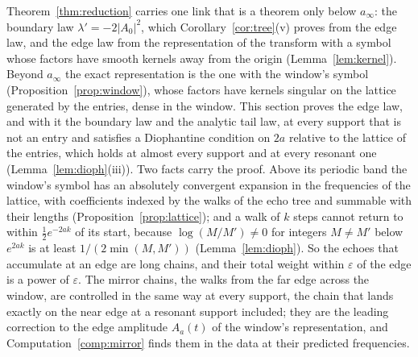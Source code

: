 \documentclass[11pt]{article}
\theoremstyle{definition}
\theoremstyle{remark}
\begin{document}
Theorem~\ref{thm:reduction} carries one link that is a theorem only below $a_\infty$: the boundary law $\lambda'=-2|A_0|^2$, which Corollary~\ref{cor:tree}(v) proves from the edge law, and the edge law from the representation of the transform with a symbol whose factors have smooth kernels away from the origin (Lemma~\ref{lem:kernel}). Beyond $a_\infty$ the exact representation is the one with the window's symbol (Proposition~\ref{prop:window}), whose factors have kernels singular on the lattice generated by the entries, dense in the window. This section proves the edge law, and with it the boundary law and the analytic tail law, at every support that is not an entry and satisfies a Diophantine condition on $2a$ relative to the lattice of the entries, which holds at almost every support and at every resonant one (Lemma~\ref{lem:dioph}(iii)). Two facts carry the proof. Above its periodic band the window's symbol has an absolutely convergent expansion in the frequencies of the lattice, with coefficients indexed by the walks of the echo tree and summable with their lengths (Proposition~\ref{prop:lattice}); and a walk of $k$ steps cannot return to within $\tfrac12e^{-2ak}$ of its start, because $\log(M/M')\ne0$ for integers $M\ne M'$ below $e^{2ak}$ is at least $1/(2\min(M,M'))$ (Lemma~\ref{lem:dioph}). So the echoes that accumulate at an edge are long chains, and their total weight within $\varepsilon$ of the edge is a power of $\varepsilon$. The mirror chains, the walks from the far edge across the window, are controlled in the same way at every support, the chain that lands exactly on the near edge at a resonant support included; they are the leading correction to the edge amplitude $A_a(t)$ of the window's representation, and Computation~\ref{comp:mirror} finds them in the data at their predicted frequencies.
\end{document}
